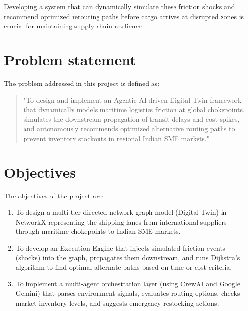 Developing a system that can dynamically simulate these friction shocks and recommend optimized rerouting paths before cargo arrives at disrupted zones is crucial for maintaining supply chain resilience.

\section[Problem statement]{\textbf{Problem statement}}
The problem addressed in this project is defined as:
\begin{quote}
"To design and implement an Agentic AI-driven Digital Twin framework that dynamically models maritime logistics friction at global chokepoints, simulates the downstream propagation of transit delays and cost spikes, and autonomously recommends optimized alternative routing paths to prevent inventory stockouts in regional Indian SME markets."
\end{quote}

\section[Objectives]{\textbf{Objectives}}
The objectives of the project are:
\begin{enumerate}
\item To design a multi-tier directed network graph model (Digital Twin) in NetworkX representing the shipping lanes from international suppliers through maritime chokepoints to Indian SME markets.
\item To develop an Execution Engine that injects simulated friction events (shocks) into the graph, propagates them downstream, and runs Dijkstra's algorithm to find optimal alternate paths based on time or cost criteria.
\item To implement a multi-agent orchestration layer (using CrewAI and Google Gemini) that parses environment signals, evaluates routing options, checks market inventory levels, and suggests emergency restocking actions.
\end{enumerate}

